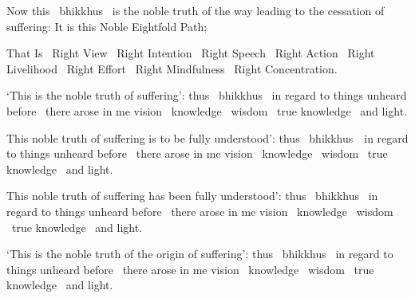 \medskip

\begin{english-hang}
  Now this \breathmark\ bhikkhus \breathmark\ is the noble truth of the way leading to the cessation of suffering: It is this Noble Eightfold Path;
\end{english-hang}

\medskip

\begin{english-hang}
  That Is \breathmark\ Right View \breathmark\ Right Intention \breathmark\ Right Speech \breathmark\ Right Action \breathmark\ Right Livelihood \breathmark\ Right Effort \breathmark\ Right Mindfulness \breathmark\ Right Concentration.
\end{english-hang}

\medskip

\begin{english-hang}
  `This is the noble truth of suffering': thus \breathmark\ bhikkhus \breathmark\ in regard to things unheard before \breathmark\ there arose in me vision \breathmark\ knowledge \breathmark\ wisdom \breathmark\ true knowledge \breathmark\ and light.
\end{english-hang}

\medskip

\begin{english-hang}
  This noble truth of suffering is to be fully understood': thus \breathmark\ \mbox{bhikkhus}~\breathmark\ in regard to things unheard before \breathmark\ there arose in me vision \breathmark\ knowledge \breathmark\ wisdom \breathmark\ true knowledge \breathmark\ and light.
\end{english-hang}

\medskip

\begin{english-hang}
  This noble truth of suffering has been fully understood': thus \breathmark\ bhikkhus \breathmark\ in regard to things unheard before \breathmark\ there arose in me vision \breathmark\ knowledge \breathmark\ wisdom \breathmark\ true knowledge \breathmark\ and light.
\end{english-hang}

\medskip

\begin{english-hang}
  `This is the noble truth of the origin of suffering': thus \breathmark\ bhikkhus \breathmark\ in regard to things unheard before \breathmark\ there arose in me vision \breathmark\ knowledge \breathmark\ wisdom \breathmark\ true knowledge \breathmark\ and light.
\end{english-hang}

